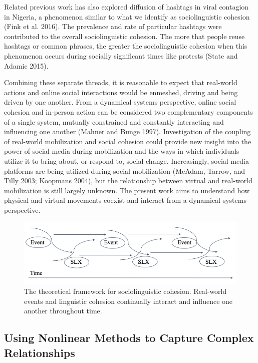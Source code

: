 \documentclass[english,man]{apa6}
\begin{document}
Related previous work has also explored diffusion of hashtags in viral contagion in
Nigeria, a phenomenon similar to what we identify as sociolinguistic cohesion
(Fink et al. 2016). The prevalence and rate of particular hashtags were
contributed to the overall sociolinguistic cohesion. The more that people
reuse hashtags or common phrases, the greater the sociolinguistic cohesion when
this phenomenon occurs during socially significant times like protests
(State and Adamic 2015).

Combining these separate threads, it is reasonable to expect that real-world
actions and online social interactions would be enmeshed, driving and being
driven by one another. From a dynamical systems perspective, online social
cohesion and in-person action can be considered two complementary components of
a single system, mutually constrained and constantly interacting and influencing
one another (Mahner and Bunge 1997). Investigation of the coupling of
real-world mobilization and social cohesion could provide new insight into the
power of social media during mobilization and the ways in which individuals
utilize it to bring about, or respond to, social change. Increasingly, social
media platforms are being utilized during social mobilization
(McAdam, Tarrow, and Tilly 2003; Koopmans 2004), but the relationship between virtual and real-world
mobilization is still largely unknown. The present work aims to understand how
physical and virtual movements coexist and interact from a dynamical systems
perspective.

\begin{figure}
\includegraphics[width=1\linewidth]{./figs/theoretical-framework} \caption{The theoretical framework for sociolinguistic cohesion. Real-world events and linguistic cohesion continually interact and influence one another throughout time.}\label{fig:theoretical-framework}
\end{figure}

\hypertarget{using-nonlinear-methods-to-capture-complex-relationships}{%
\subsection{Using Nonlinear Methods to Capture Complex Relationships}\label{using-nonlinear-methods-to-capture-complex-relationships}}
\end{document}
